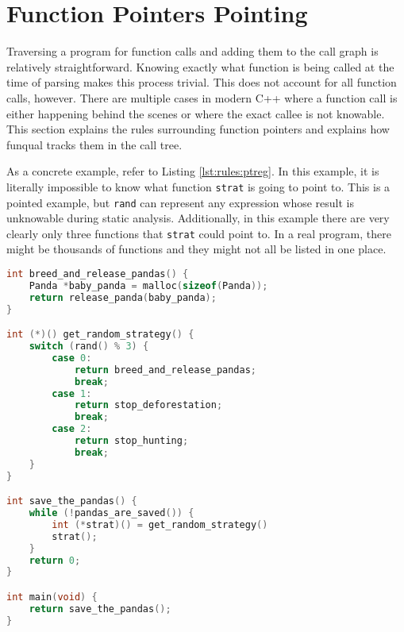 \section{Function Pointers Pointing}\label{sec:rules:funptrs}

Traversing a program for function calls and adding them to the call graph is relatively straightforward.  Knowing exactly what function is being called at the time of parsing makes this process trivial.  This does not account for all function calls, however.  There are multiple cases in modern C++ where a function call is either happening behind the scenes or where the exact callee is not knowable.  This section explains the rules surrounding function pointers and explains how funqual tracks them in the call tree.

As a concrete example, refer to Listing \ref{lst:rules:ptreg}.  In this example, it is literally impossible to know what function \lstinline{strat} is going to point to.  This is a pointed example, but \lstinline{rand} can represent any expression whose result is unknowable during static analysis.  Additionally, in this example there are very clearly only three functions that \lstinline{strat} could point to.  In a real program, there might be thousands of functions and they might not all be listed in one place.  

\noindent\begin{minipage}[t]{\linewidth}
\begin{lstlisting}[language=C,caption={In this example C program, it is impossible to know statically what the value of strat is.  Because of this, funqual requires the programmer to annotate function pointers with additional type information. },label={lst:rules:ptreg}]
int breed_and_release_pandas() {
    Panda *baby_panda = malloc(sizeof(Panda));
    return release_panda(baby_panda);
}

int (*)() get_random_strategy() {
    switch (rand() % 3) {
        case 0:
            return breed_and_release_pandas;
            break;
        case 1:
            return stop_deforestation;
            break;
        case 2:
            return stop_hunting;
            break;
    }
}

int save_the_pandas() {
    while (!pandas_are_saved()) {
        int (*strat)() = get_random_strategy()
        strat();
    }
    return 0;
}

int main(void) {
    return save_the_pandas();
}
\end{lstlisting}
\end{minipage}

